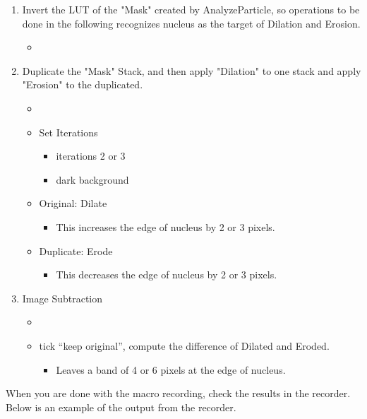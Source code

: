 \begin{enumerate}
\begin{itemize}
  \end{itemize}
  \item Invert the LUT of the "Mask" created by AnalyzeParticle, so operations to be done in the following recognizes nucleus as the target of Dilation and Erosion. 
  \begin{itemize}
    \item {}
  \end{itemize}
  \item Duplicate the "Mask" Stack, and then apply "Dilation" to one stack and apply "Erosion" to the duplicated.
  \begin{itemize}
    \item {}
    \item Set Iterations 
    \begin{itemize}
      \item iterations 2 or 3
      \item dark background
    \end{itemize}
    \item Original: Dilate 
    \begin{itemize}
      \item This increases the edge of nucleus by 2 or 3 pixels. 
    \end{itemize}
    \item Duplicate: Erode 
    \begin{itemize}
      \item This decreases the edge of nucleus by 2 or 3 pixels. 
    \end{itemize}
  \end{itemize}
  \item Image Subtraction
  \begin{itemize}
    \item {}
    \item tick ``keep original'', compute the difference of Dilated and Eroded.
    \begin{itemize}
      \item Leaves a band of 4 or 6 pixels at the edge of nucleus. 
    \end{itemize} 
  \end{itemize}
\end{enumerate}

When you are done with the macro recording, check the results in the recorder. Below is an example of the output from the recorder. 

